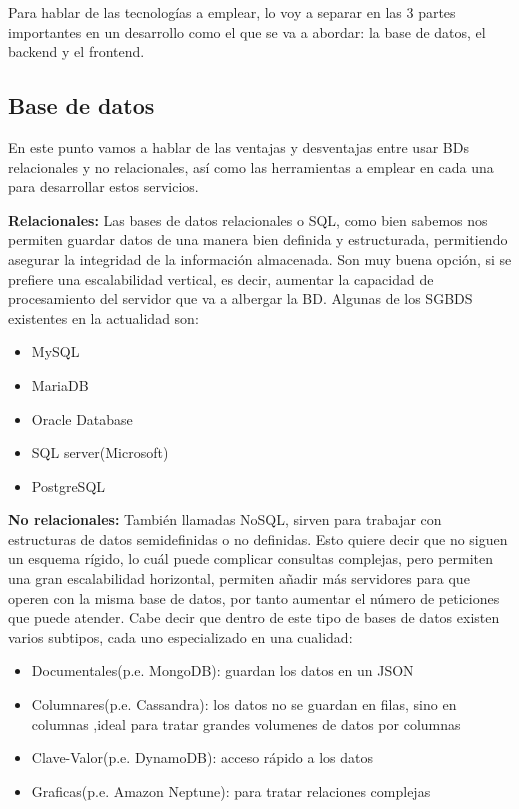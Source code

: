 Para hablar de las tecnologías a emplear, lo voy a separar en las 3 partes importantes en un desarrollo como el que se va a abordar: la base de datos, el backend y el frontend.

\subsection{Base de datos}

En este punto vamos a hablar de las ventajas y desventajas entre usar BDs relacionales y no relacionales, así como las herramientas a emplear en cada una para desarrollar estos servicios.

\textbf{Relacionales:} Las bases de datos relacionales o SQL, como bien sabemos nos permiten guardar datos de una manera bien definida y estructurada, permitiendo asegurar la integridad de la información almacenada. Son muy buena opción, si se prefiere una escalabilidad vertical, es decir, aumentar la capacidad de procesamiento del servidor que va a albergar la BD. Algunas de los SGBDS existentes en la actualidad son:

\begin{itemize}
	\item MySQL
	\item MariaDB
	\item Oracle Database
	\item SQL server(Microsoft)
	\item PostgreSQL
\end{itemize}

\textbf{No relacionales:} También llamadas NoSQL, sirven para trabajar con estructuras de datos semidefinidas o no definidas. Esto quiere decir que no siguen un esquema rígido, lo cuál puede complicar consultas complejas, pero permiten una gran escalabilidad horizontal, permiten añadir más servidores para que operen con la misma base de datos, por tanto aumentar el número de peticiones que puede atender. Cabe decir que dentro de este tipo de bases de datos existen varios subtipos, cada uno especializado en una cualidad:

\begin{itemize}
	\item Documentales(p.e. MongoDB): guardan los datos en un JSON
	\item Columnares(p.e. Cassandra): los datos no se guardan en filas, sino en columnas ,ideal para tratar grandes volumenes de datos por columnas
	\item Clave-Valor(p.e. DynamoDB): acceso rápido a los datos
	\item Graficas(p.e. Amazon Neptune): para tratar relaciones complejas
\end{itemize}

